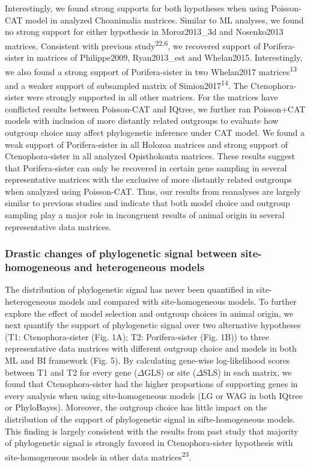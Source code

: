 \documentclass[]{article}
\begin{document}
Interestingly, we found strong supports for both hypotheses when using
Poisson-CAT model in analyzed Choanimalia matrices. Similar to ML
analyses, we found no strong support for either hypothesis in
Moroz2013\_3d and Nosenko2013 matrices. Consistent with previous
study\textsuperscript{22,6}, we recovered support of Porifera-sister in
matrices of Philippe2009, Ryan2013\_est and Whelan2015. Interestingly,
we also found a strong support of Porifera-sister in two Whelan2017
matrices\textsuperscript{13} and a weaker support of subsampled matrix
of Simion2017\textsuperscript{14}. The Ctenophora-sister were strongly
supported in all other matrices. For the matrices have conflicted
results between Poisson-CAT and IQtree, we further ran Poisson+CAT
models with inclusion of more distantly related outgroups to evaluate
how outgroup choice may affect phylogenetic inference under CAT model.
We found a weak support of Porifera-sister in all Holozoa matrices and
strong support of Ctenophora-sister in all analyzed Opisthokonta
matrices. These results suggest that Porifera-sister can only be
recovered in certain gene sampling in several representative matrices
with the exclusive of more distantly related outgroups when analyzed
using Poisson-CAT. Thus, our results from reanalyses are largely similar
to previous studies and indicate that both model choice and outgroup
sampling play a major role in incongruent results of animal origin in
several representative data matrices.

\hypertarget{drastic-changes-of-phylogenetic-signal-between-site--homogeneous-and-heterogeneous-models}{%
\subsubsection{Drastic changes of phylogenetic signal between site-
homogeneous and heterogeneous
models}\label{drastic-changes-of-phylogenetic-signal-between-site--homogeneous-and-heterogeneous-models}}

The distribution of phylogenetic signal has never been quantified in
site-heterogeneous models and compared with site-homogeneous models. To
further explore the effect of model selection and outgroup choices in
animal origin, we next quantify the support of phylogenetic signal over
two alternative hypotheses (T1: Ctenophora-sister (Fig. 1A); T2:
Porifera-sister (Fig. 1B)) to three representative data matrices with
different outgroup choice and models in both ML and BI framework (Fig.
5). By calculating gene-wise log-likelihood scores between T1 and T2 for
every gene (\(\Delta\)GLS) or site (\(\Delta\)SLS) in each matrix, we
found that Ctenophora-sister had the higher proportions of supporting
genes in every analysis when using site-homogeneous models (LG or WAG in
both IQtree or PhyloBayes). Moreover, the outgroup choice has little
impact on the distribution of the support of phylogenetic signal in
sifte-homogeneous models. This finding is largely consistent with the
results from past study that majority of phylogenetic signal is strongly
favored in Ctenophora-sister hypothesis with site-homogeneous models in
other data matrices\textsuperscript{23}.
\end{document}
